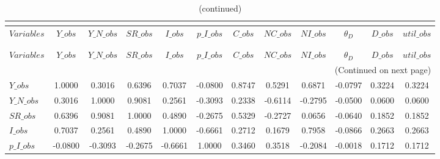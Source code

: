  
\begin{center}
\begin{longtable}{lccccccccccc} 
\caption{MATRIX OF CORRELATIONS}\\
 \label{Table:th_corr_matrix}\\
\toprule 
$Variables   $	 & 	 $       Y\_obs$	 & 	 $   Y\_N\_obs$	 & 	 $      SR\_obs$	 & 	 $       I\_obs$	 & 	 $   p\_I\_obs$	 & 	 $       C\_obs$	 & 	 $      NC\_obs$	 & 	 $      NI\_obs$	 & 	 $   {\theta_D}$	 & 	 $       D\_obs$	 & 	 $    util\_obs$\\
\midrule \endfirsthead 
\caption{(continued)}\\
 \toprule \\ 
$Variables   $	 & 	 $       Y\_obs$	 & 	 $   Y\_N\_obs$	 & 	 $      SR\_obs$	 & 	 $       I\_obs$	 & 	 $   p\_I\_obs$	 & 	 $       C\_obs$	 & 	 $      NC\_obs$	 & 	 $      NI\_obs$	 & 	 $   {\theta_D}$	 & 	 $       D\_obs$	 & 	 $    util\_obs$\\
\midrule \endhead 
\midrule \multicolumn{12}{r}{(Continued on next page)} \\ \bottomrule \endfoot 
\bottomrule \endlastfoot 
$Y\_obs      $	 & 	        1.0000	 & 	        0.3016	 & 	        0.6396	 & 	        0.7037	 & 	       -0.0800	 & 	        0.8747	 & 	        0.5291	 & 	        0.6871	 & 	       -0.0797	 & 	        0.3224	 & 	        0.3224 \\ 
$Y\_N\_obs   $	 & 	        0.3016	 & 	        1.0000	 & 	        0.9081	 & 	        0.2561	 & 	       -0.3093	 & 	        0.2338	 & 	       -0.6114	 & 	       -0.2795	 & 	       -0.0500	 & 	        0.0600	 & 	        0.0600 \\ 
$SR\_obs     $	 & 	        0.6396	 & 	        0.9081	 & 	        1.0000	 & 	        0.4890	 & 	       -0.2675	 & 	        0.5329	 & 	       -0.2727	 & 	        0.0656	 & 	       -0.0640	 & 	        0.1852	 & 	        0.1852 \\ 
$I\_obs      $	 & 	        0.7037	 & 	        0.2561	 & 	        0.4890	 & 	        1.0000	 & 	       -0.6661	 & 	        0.2712	 & 	        0.1679	 & 	        0.7958	 & 	       -0.0866	 & 	        0.2663	 & 	        0.2663 \\ 
$p\_I\_obs   $	 & 	       -0.0800	 & 	       -0.3093	 & 	       -0.2675	 & 	       -0.6661	 & 	        1.0000	 & 	        0.3460	 & 	        0.3518	 & 	       -0.2084	 & 	       -0.0018	 & 	        0.1712	 & 	        0.1712 \\ 

\end{longtable}
\end{center}
